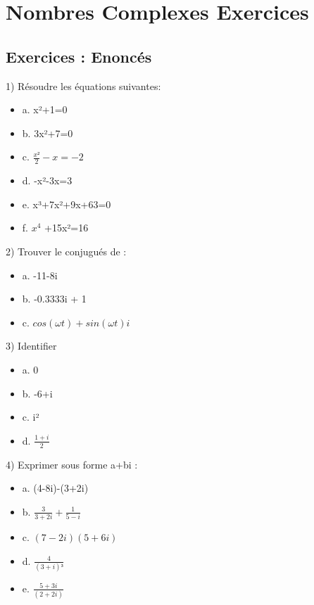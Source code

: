\newpage

\section{Nombres Complexes Exercices}
\vspace{5mm} %
\subsection{Exercices : Enoncés}

\vspace{5mm} %
1) Résoudre les équations suivantes:

\begin{itemize}
\item {a. x²+1=0}
\item {b. 3x²+7=0}
\item {c. $\frac{x²}{2} -x=-2$}
\item {d. -x²-3x=3}
\item {e. x³+7x²+9x+63=0}
\item {f. $x^{4}$ +15x²=16}
\end{itemize}

\vspace{3mm} %
2) Trouver le conjugués de :

\begin{itemize}
\item {a. -11-8i}
\item {b. -0.3333i + 1}
\item {c. $cos(\omega t) + sin(\omega t)i$}
\end{itemize}

\vspace{3mm} %
3) Identifier \R $  $ \I

\begin{itemize}
\item {a. 0}
\item {b. -6+i}
\item {c. i²}
\item {d. $\frac{1+i}{2}$}
\end{itemize}


\vspace{3mm} %
4) Exprimer sous forme a+bi :

\begin{itemize}
\item {a. (4-8i)-(3+2i)}
\item {b. $\frac{3}{3+2i} + \frac{1}{5-i}$}
\item {c. $(7-2i)(5+6i)$}
\item {d. $\frac{4}{(3+i)³}$}
\item {e. $\frac{5+3i}{(2+2i)} $}
\end{itemize}

